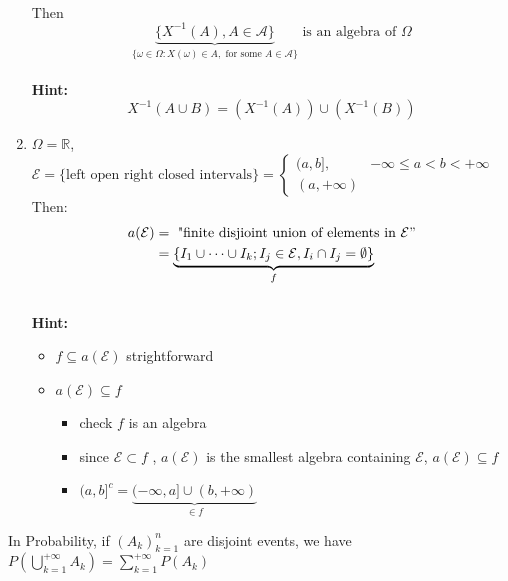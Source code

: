 \begin{enumerate}[label=\circled{\arabic*}]
\\Then $$\underbrace{\{X^{-1}(A),A\in \mathcal{A} \}}_{\{\omega \in \Omega :X(\omega)\in A, \text{  for some } A \in \mathcal{A} \}} \text{  is an algebra of  } \Omega$$  
\\\textbf{Hint:} $$X^{-1}(A\cup B)=(X^{-1}(A))\cup (X^{-1}(B))$$
\item $\Omega = \mathbb{R}$, $\mathcal{E} = \{\text{left open right closed intervals}\} = 
\begin{cases}
    (a,b], & -\infty \leq a < b < +\infty \\
    (a,+\infty)
\end{cases}$
\\Then:\begin{align*}a(\mathcal{E})&=\text{  "finite disjioint union of elements in }\mathcal{E}"
\\&=\underbrace{\{ I_1\cup\cdots\cup I_k;I_j \in \mathcal{E} , I_i \cap I_j =\emptyset \}}_f
\end{align*}
\\\textbf{Hint:} 
\begin{itemize}
\item $ f \subseteq a(\mathcal{E}) $ strightforward
\item $ a(\mathcal{E}) \subseteq f $ \begin{itemize}
\item check $ f  $ is an algebra
\item since $ \mathcal{E}\subset f $ , $ a(\mathcal{E}) $ is the smallest algebra containing $ \mathcal{E} $, $ a(\mathcal{E}) \subseteq f $
\item ${(a,b]}^c=\underbrace{(-\infty,a]\cup(b,+\infty)}_{\in f}$
\end{itemize}
\end{itemize}

\end{enumerate}

\begin{lemma}{}{}
    In Probability, if $ {(A_k)}_{k=1}^n $ are disjoint events,
    we have $P(\bigcup_{k=1}^{+\infty}A_k)=\sum_{k=1}^{+\infty}P(A_k)$
\end{lemma}

